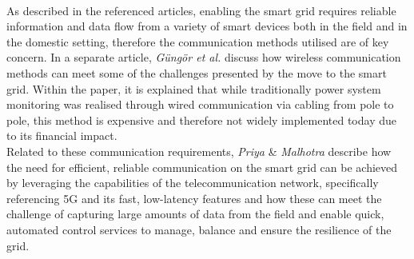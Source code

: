 \\
As described in the referenced articles, enabling the smart grid requires reliable information and data flow from a variety of smart devices both in the field and in the domestic setting, therefore the communication
methods utilised are of key concern. In a separate article, \textit{Güngör et al.} \cite{5406152} discuss how wireless communication methods can meet some of the challenges presented by the move to the smart grid.
Within the paper, it is explained that while traditionally power system monitoring was realised through wired communication via cabling from pole to pole, this method is expensive and therefore not widely implemented today due to its
financial impact.
\\
Related to these communication requirements, \textit{Priya} \& \textit{Malhotra} \cite{9231264} describe how the need for efficient, reliable communication on the smart grid can be achieved by leveraging the capabilities of the telecommunication network,
specifically referencing 5G and its fast, low-latency features and how these can meet the challenge of capturing large amounts of data from the field and enable quick, automated control services to manage, balance and ensure
the resilience of the grid.


